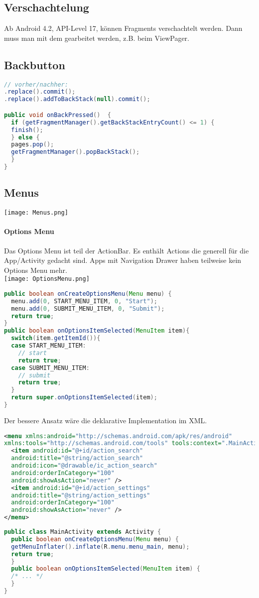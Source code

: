 \subsection{Verschachtelung}
Ab Android 4.2, API-Level 17, können Fragments verschachtelt werden. Dann muss man mit dem  gearbeitet werden, z.B. beim ViewPager.

\subsection{Backbutton}
\begin{lstlisting}[language=java]
// vorher/nachher:
.replace().commit();
.replace().addToBackStack(null).commit();

public void onBackPressed()  {
  if (getFragmentManager().getBackStackEntryCount() <= 1) { 
  finish();
  } else {
  pages.pop();
  getFragmentManager().popBackStack();
  }
}
\end{lstlisting}

\subsection{Menus}
\texttt{[image: Menus.png]}
\paragraph{Options Menu} Das Options Menu ist teil der ActionBar. Es enthält Actions die generell für die App/Activity gedacht sind. Apps mit Navigation Drawer haben teilweise kein Options Menu mehr. \\
\texttt{[image: OptionsMenu.png]}
\begin{lstlisting}[language=java]
public boolean onCreateOptionsMenu(Menu menu) {
  menu.add(0, START_MENU_ITEM, 0, "Start");
  menu.add(0, SUBMIT_MENU_ITEM, 0, "Submit");
  return true;
}
public boolean onOptionsItemSelected(MenuItem item){
  switch(item.getItemId()){
  case START_MENU_ITEM:
    // start
    return true;
  case SUBMIT_MENU_ITEM:
    // submit
    return true;
  }
  return super.onOptionsItemSelected(item);
}
\end{lstlisting}
Der bessere Ansatz wäre die deklarative Implementation im XML.
\begin{lstlisting}[language=xml]
<menu xmlns:android="http://schemas.android.com/apk/res/android"
xmlns:tools="http://schemas.android.com/tools" tools:context=".MainActivity">
  <item android:id="@+id/action_search"
  android:title="@string/action_search"
  android:icon="@drawable/ic_action_search"
  android:orderInCategory="100"
  android:showAsAction="never" />
  <item android:id="@+id/action_settings"
  android:title="@string/action_settings"
  android:orderInCategory="100"
  android:showAsAction="never" />
</menu>
\end{lstlisting}
\begin{lstlisting}[language=java]
public class MainActivity extends Activity {
  public boolean onCreateOptionsMenu(Menu menu) {
  getMenuInflater().inflate(R.menu.menu_main, menu);
  return true;
  }
  public boolean onOptionsItemSelected(MenuItem item) {
  /* ... */
  }
}
\end{lstlisting}

